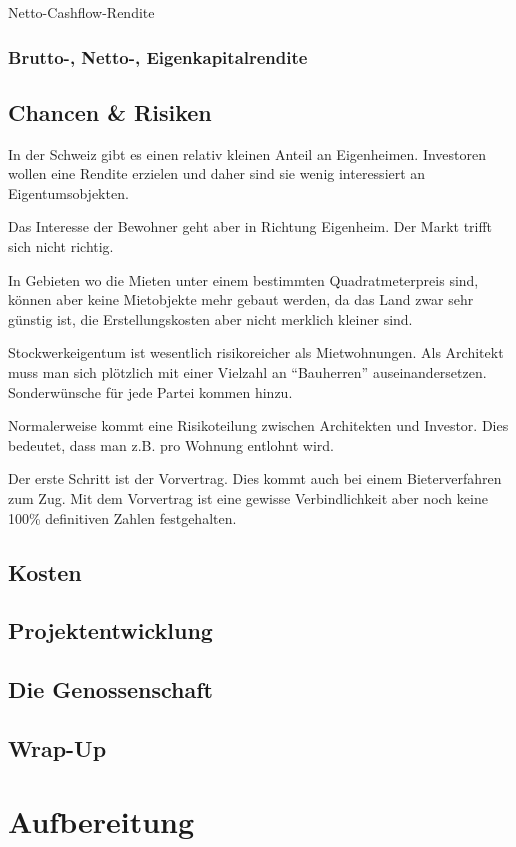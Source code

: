 \documentclass[11pt]{article}
\begin{document}
Netto-Cashflow-Rendite

\subsubsection{Brutto-, Netto-, Eigenkapitalrendite}
\label{sec-2-3-3}

\subsection{Chancen \& Risiken}
\label{sec-2-4}

In der Schweiz gibt es einen relativ kleinen Anteil an
Eigenheimen. Investoren wollen eine Rendite erzielen und daher sind sie wenig
interessiert an Eigentumsobjekten.

Das Interesse der Bewohner geht aber in Richtung Eigenheim. Der Markt trifft
sich nicht richtig.

In Gebieten wo die Mieten unter einem bestimmten Quadratmeterpreis sind,
können aber keine Mietobjekte mehr gebaut werden, da das Land zwar sehr
günstig ist, die Erstellungskosten aber nicht merklich kleiner sind.

Stockwerkeigentum ist wesentlich risikoreicher als Mietwohnungen. Als
Architekt muss man sich plötzlich mit einer Vielzahl an ``Bauherren''
auseinandersetzen. Sonderwünsche für jede Partei kommen hinzu.

Normalerweise kommt eine Risikoteilung zwischen Architekten und
Investor. Dies bedeutet, dass man z.B. pro Wohnung entlohnt wird.

Der erste Schritt ist der Vorvertrag. Dies kommt auch bei einem
Bieterverfahren zum Zug. Mit dem Vorvertrag ist eine gewisse Verbindlichkeit
aber noch keine 100\% definitiven Zahlen festgehalten.

\subsection{Kosten}
\label{sec-2-5}

\subsection{Projektentwicklung}
\label{sec-2-6}

\subsection{Die Genossenschaft}
\label{sec-2-7}

\subsection{Wrap-Up}
\label{sec-2-8}

\section{Aufbereitung}
\label{sec-3}
\end{document}
